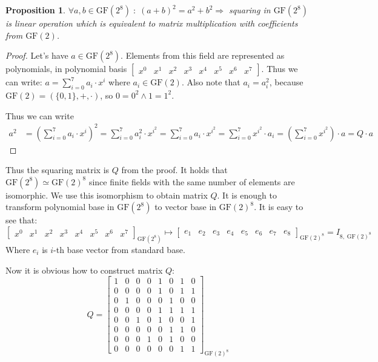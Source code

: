 \documentclass[11pt,oneside,final]{fithesis2}
\newtheorem{myprop}{Proposition}
\newcommand{\gfe}{\ensuremath{\text{GF}\left(2^8\right)}}
\newcommand{\gf}{\ensuremath{\text{GF}\left(2\right)}}
\begin{document}
    \begin{myprop}
    $\forall a,b \in \gfe \; : \; \left(a + b\right)^2 = a^2 + b^2 \Rightarrow $ squaring in $\gfe$ is linear operation which is 
    equivalent to matrix multiplication with coefficients from $\gf$.
    \end{myprop}
    \begin{proof}
    Let's have $a \in \gfe$. Elements from this field are represented as
    polynomials, in polynomial basis $\begin{bmatrix} x^0 & x^{1} & x^{2} & x^{3} & x^{4} & x^{5} & x^{6} & x^{7}\end{bmatrix}$. 
    Thus we can write: $a = \sum_{i=0}^7 a_i \cdot x^i$ where $a_i \in \gf$. Also note that
    $a_i = a_i^2$, because $\gf = \left(\{0,1\}, +, \cdot\right)$, so $0=0^2 \wedge 1=1^2$.

    Thus we can write
    \begin{align*}
	a^2 &= \left(\sum_{i=0}^7 a_i   \cdot x^i\right)^2 
	    =       \sum_{i=0}^7 a_i^2 \cdot x^{i^2} 
	    =       \sum_{i=0}^7 a_i \cdot x^{i^2} 
	    =       \sum_{i=0}^7 x^{i^2} \cdot a_i
	    = \left(\sum_{i=0}^7 x^{i^2}\right) \cdot a
	    = Q \cdot a
    \end{align*}
    \end{proof}
    Thus the squaring matrix is $Q$ from the proof. It holds that $\gfe \simeq \gf^8$ since finite fields with the same number of elements are isomorphic. 
    We use this isomorphism to obtain matrix $Q$. It is enough to transform polynomial base in $\gfe$ to vector base in $\gf^8$. It is easy to see that:
    \begin{equation*}
     \begin{bmatrix} x^0 & x^{1} & x^{2} & x^{3} & x^{4} & x^{5} & x^{6} & x^{7}\end{bmatrix}_{\gfe} \mapsto \begin{bmatrix} e_1 & e_2 & e_3 & e_4 & e_5 & e_6 & e_7 & e_8\end{bmatrix}_{\gf^8} = I_{8,\;\gf^8}
    \end{equation*}
    Where $e_i$ is $i$-th base vector from standard base.
    
    Now it is obvious how to construct matrix $Q$:
    \begin{equation*}
     Q = \begin{bmatrix} 
	    1 & 0 & 0 & 0 & 1 & 0 & 1 & 0\\
	    0 & 0 & 0 & 0 & 1 & 0 & 1 & 1\\
	    0 & 1 & 0 & 0 & 0 & 1 & 0 & 0\\
	    0 & 0 & 0 & 0 & 1 & 1 & 1 & 1\\
	    0 & 0 & 1 & 0 & 1 & 0 & 0 & 1\\
	    0 & 0 & 0 & 0 & 0 & 1 & 1 & 0\\
	    0 & 0 & 0 & 1 & 0 & 1 & 0 & 0\\
	    0 & 0 & 0 & 0 & 0 & 0 & 1 & 1
         \end{bmatrix}_{\gf^8}
    \end{equation*}
\end{document}
